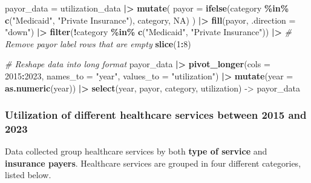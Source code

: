 \documentclass[
]{article}
\newenvironment{Shaded}{\begin{snugshade}}{\end{snugshade}}
\newcommand{\AttributeTok}[1]{\textcolor[rgb]{0.13,0.29,0.53}{#1}}
\newcommand{\CommentTok}[1]{\textcolor[rgb]{0.56,0.35,0.01}{\textit{#1}}}
\newcommand{\ConstantTok}[1]{\textcolor[rgb]{0.56,0.35,0.01}{#1}}
\newcommand{\DecValTok}[1]{\textcolor[rgb]{0.00,0.00,0.81}{#1}}
\newcommand{\FunctionTok}[1]{\textcolor[rgb]{0.13,0.29,0.53}{\textbf{#1}}}
\newcommand{\NormalTok}[1]{#1}
\newcommand{\OtherTok}[1]{\textcolor[rgb]{0.56,0.35,0.01}{#1}}
\newcommand{\SpecialCharTok}[1]{\textcolor[rgb]{0.81,0.36,0.00}{\textbf{#1}}}
\newcommand{\StringTok}[1]{\textcolor[rgb]{0.31,0.60,0.02}{#1}}
\begin{document}
\begin{Shaded}
\begin{Highlighting}[]
\NormalTok{payor\_data }\OtherTok{=}\NormalTok{ utilization\_data }\SpecialCharTok{|\textgreater{}}
  \FunctionTok{mutate}\NormalTok{(}
    \AttributeTok{payor =} \FunctionTok{ifelse}\NormalTok{(category }\SpecialCharTok{\%in\%} \FunctionTok{c}\NormalTok{(}\StringTok{"Medicaid"}\NormalTok{, }\StringTok{"Private Insurance"}\NormalTok{), category, }\ConstantTok{NA}\NormalTok{)}
\NormalTok{  ) }\SpecialCharTok{|\textgreater{}} 
  \FunctionTok{fill}\NormalTok{(payor, }\AttributeTok{.direction =} \StringTok{"down"}\NormalTok{) }\SpecialCharTok{|\textgreater{}} 
  \FunctionTok{filter}\NormalTok{(}\SpecialCharTok{!}\NormalTok{category }\SpecialCharTok{\%in\%} \FunctionTok{c}\NormalTok{(}\StringTok{"Medicaid"}\NormalTok{, }\StringTok{"Private Insurance"}\NormalTok{)) }\SpecialCharTok{|\textgreater{}} \CommentTok{\# Remove payor label rows that are empty }
  \FunctionTok{slice}\NormalTok{(}\DecValTok{1}\SpecialCharTok{:}\DecValTok{8}\NormalTok{)}

\CommentTok{\# Reshape data into long format}
\NormalTok{payor\_data }\SpecialCharTok{|\textgreater{}}
  \FunctionTok{pivot\_longer}\NormalTok{(}\AttributeTok{cols =} \StringTok{\textasciigrave{}}\AttributeTok{2015}\StringTok{\textasciigrave{}}\SpecialCharTok{:}\StringTok{\textasciigrave{}}\AttributeTok{2023}\StringTok{\textasciigrave{}}\NormalTok{, }\AttributeTok{names\_to =} \StringTok{"year"}\NormalTok{, }\AttributeTok{values\_to =} \StringTok{"utilization"}\NormalTok{) }\SpecialCharTok{|\textgreater{}}
  \FunctionTok{mutate}\NormalTok{(}\AttributeTok{year =} \FunctionTok{as.numeric}\NormalTok{(year)) }\SpecialCharTok{|\textgreater{}}
  \FunctionTok{select}\NormalTok{(year, payor, category, utilization) }\OtherTok{{-}\textgreater{}}\NormalTok{ payor\_data}
\end{Highlighting}
\end{Shaded}

\hypertarget{utilization-of-different-healthcare-services-between-2015-and-2023}{%
\subsubsection{Utilization of different healthcare services between 2015
and
2023}\label{utilization-of-different-healthcare-services-between-2015-and-2023}}

Data collected group healthcare services by both \textbf{type of
service} and \textbf{insurance payers}. Healthcare services are grouped
in four different categories, listed below.
\end{document}
